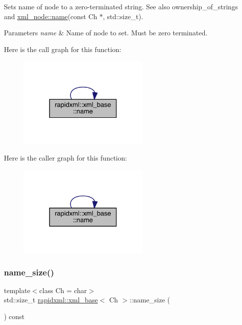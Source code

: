 Sets name of node to a zero-\/terminated string. See also ownership\+\_\+of\+\_\+strings and \mbox{\hyperlink{classrapidxml_1_1xml__base_aef8ae147fbee59209f714274afc80dc4}{xml\+\_\+node\+::name}}(const Ch $\ast$, std\+::size\+\_\+t).
\begin{DoxyParams}{Parameters}
{\em name} & Name of node to set. Must be zero terminated. \\
\hline
\end{DoxyParams}
Here is the call graph for this function\+:\nopagebreak
\begin{figure}[H]
\begin{center}
\leavevmode
\includegraphics[width=182pt]{classrapidxml_1_1xml__base_a4611ddc82ac83a527c65606600eb2a0d_cgraph}
\end{center}
\end{figure}
Here is the caller graph for this function\+:\nopagebreak
\begin{figure}[H]
\begin{center}
\leavevmode
\includegraphics[width=182pt]{classrapidxml_1_1xml__base_a4611ddc82ac83a527c65606600eb2a0d_icgraph}
\end{center}
\end{figure}
\mbox{\label{classrapidxml_1_1xml__base_a20c8ffbe0c7a0b4231681ab8b99330a4}} 
\subsubsection{\texorpdfstring{name\_size()}{name\_size()}}
{\footnotesize\ttfamily template$<$class Ch  = char$>$ \\
std\+::size\+\_\+t \mbox{\hyperlink{classrapidxml_1_1xml__base}{rapidxml\+::xml\+\_\+base}}$<$ Ch $>$\+::name\+\_\+size (\begin{DoxyParamCaption}{ }\end{DoxyParamCaption}) const\hspace{0.3cm}{\ttfamily [inline]}}

